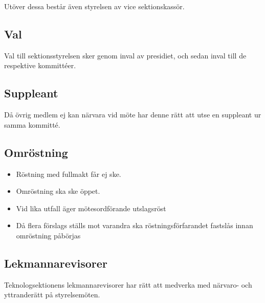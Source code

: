Utöver dessa består även styrelsen av vice sektionskassör.

\subsection{Val}
Val till sektionsstyrelsen sker genom inval av presidiet, och sedan inval till de respektive kommittéer.

\subsection{Suppleant}
Då övrig medlem ej kan närvara vid möte har denne rätt att utse en suppleant ur samma kommitté.

\subsection{Omröstning} 

\begin{itemize}
  \item Röstning med fullmakt får ej ske. 
  \item Omröstning ska ske öppet.
  \item Vid lika utfall äger mötesordförande utslagsröst
  \item Då flera förslags ställs mot varandra ska röstningsförfarandet fastslås innan omröstning påbörjas
\end{itemize}

\subsection{Lekmannarevisorer}
Teknologsektionens lekmannarevisorer har rätt att medverka med närvaro-
och yttranderätt på styrelsemöten.
\newpage

